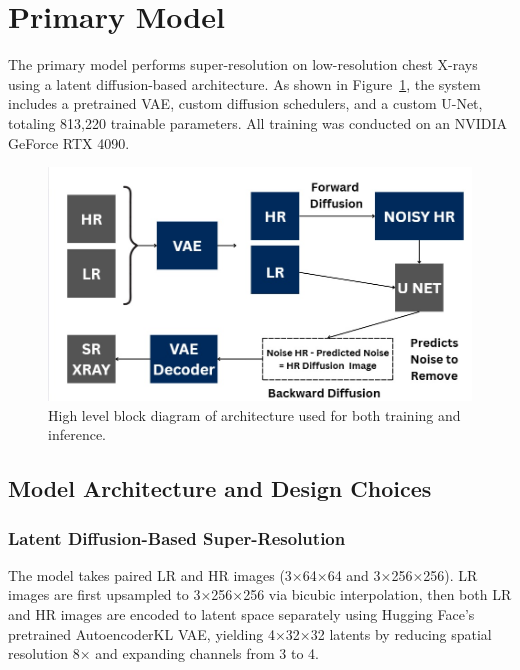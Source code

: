 \documentclass{article} %
\begin{document}
\section{Primary Model}

The primary model performs super-resolution on low-resolution chest X-rays using a latent diffusion-based architecture. As shown in Figure~\ref{model2}, the system includes a pretrained VAE, custom diffusion schedulers, and a custom U-Net, totaling 813,220 trainable parameters. All training was conducted on an NVIDIA GeForce RTX 4090.

\begin{figure}[h]
\begin{center}
\includegraphics[width=1\textwidth]{progress/Figs/model2.jpg}
\end{center}
\caption{High level block diagram of architecture used for both training and inference.}
\label{model2}
\end{figure}

\subsection{Model Architecture and Design Choices}

\subsubsection{Latent Diffusion-Based Super-Resolution}

The model takes paired LR and HR images (3×64×64 and 3×256×256). LR images are first upsampled to 3×256×256 via bicubic interpolation, then both LR and HR images are encoded to latent space separately using Hugging Face’s pretrained AutoencoderKL VAE, yielding 4×32×32 latents by reducing spatial resolution 8× and expanding channels from 3 to 4.
\end{document}
